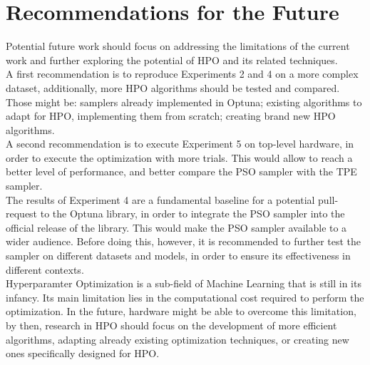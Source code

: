\section{Recommendations for the Future}

Potential future work should focus on addressing the limitations of the current work and further exploring the potential of HPO and its related techniques.
\\[0.3cm]A first recommendation is to reproduce Experiments 2 and 4 on a more complex dataset, additionally, more HPO algorithms should be tested and compared. Those might be: samplers already implemented in Optuna; existing algorithms to adapt for HPO, implementing them from scratch; creating brand new HPO algorithms.
\\[0.3cm]A second recommendation is to execute Experiment 5 on top-level hardware, in order to execute the optimization with more trials. This would allow to reach a better level of performance, and better compare the PSO sampler with the TPE sampler.
\\[0.3cm]The results of Experiment 4 are a fundamental baseline for a potential pull-request to the Optuna library, in order to integrate the PSO sampler into the official release of the library. This would make the PSO sampler available to a wider audience. Before doing this, however, it is recommended to further test the sampler on different datasets and models, in order to ensure its effectiveness in different contexts.
\\[0.3cm]Hyperparamter Optimization is a sub-field of Machine Learning that is still in its infancy. Its main limitation lies in the computational cost required to perform the optimization. In the future, hardware might be able to overcome this limitation, by then, research in HPO should focus on the development of more efficient algorithms, adapting already existing optimization techniques, or creating new ones specifically designed for HPO.   
